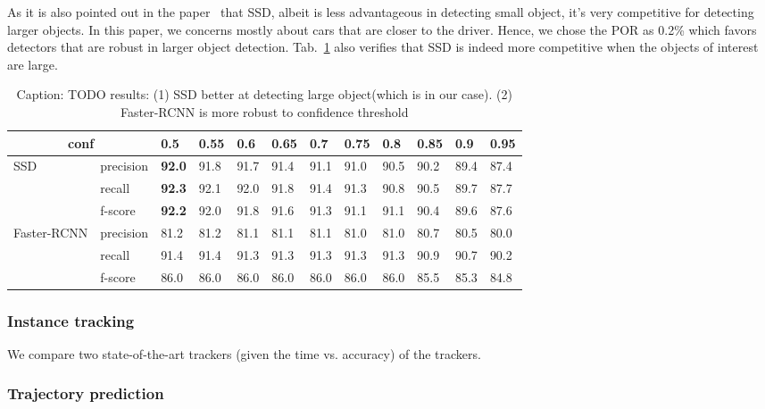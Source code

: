 \documentclass[10pt,twocolumn,letterpaper]{article}
\newcommand{\ra}[1]{\renewcommand{\arraystretch}{#1}}
\begin{document}
As it is also pointed out in the paper~\cite{huang2017speed} that SSD, albeit is less advantageous in detecting small object, it's very competitive for detecting larger objects. In this paper, we concerns mostly about cars that are closer to the driver. Hence, we chose the POR as 0.2\% which favors detectors that are robust in larger object detection. 
Tab.~\ref{tab:ssd_fasterrcnn} also verifies that SSD is indeed more competitive when the objects of interest are large.



\begin{table}\centering
\ra{1.}
\begin{tabular}{@{}llllllllllll@{}}\toprule
\multicolumn{2}{c}{conf}  & 0.5  & 0.55 & 0.6 &  0.65 & 0.7  & 0.75 & 0.8 &  0.85 & 0.9  & 0.95\\
\hline
\multirow{3}{*}{SSD}&   precision & \textbf{92.0 } & 91.8 & 91.7 & 91.4 & 91.1 & 91.0 & 90.5 & 90.2 & 89.4 & 87.4\\
                    &    recall   & \textbf{92.3}  & 92.1 & 92.0 & 91.8 & 91.4 & 91.3 & 90.8 & 90.5 & 89.7 & 87.7\\
                    &    f-score  & \textbf{92.2 } & 92.0 & 91.8 & 91.6 & 91.3 & 91.1 & 91.1 & 90.4 & 89.6 & 87.6\\
\multirow{3}{*}{Faster-RCNN}
                    &   precision & 81.2  & 81.2  & 81.1 & 81.1 & 81.1 & 81.0 & 81.0 & 80.7 & 80.5 & 80.0 \\
                    &   recall    & 91.4  & 91.4  & 91.3 & 91.3 & 91.3 & 91.3 & 91.3 & 90.9 & 90.7 & 90.2\\
                    &   f-score   & 86.0  & 86.0  & 86.0 & 86.0 & 86.0 & 86.0 & 86.0 & 85.5 & 85.3 & 84.8\\
\bottomrule
\end{tabular}
\caption{Caption: TODO results: (1) SSD better at detecting large object(which is in our case). (2) Faster-RCNN  is more robust to confidence threshold}
\label{tab:ssd_fasterrcnn}
\end{table}

\subsubsection{Instance tracking}

We compare two state-of-the-art trackers (given the time vs. accuracy) of the trackers.

\subsubsection{Trajectory prediction}
\end{document}
